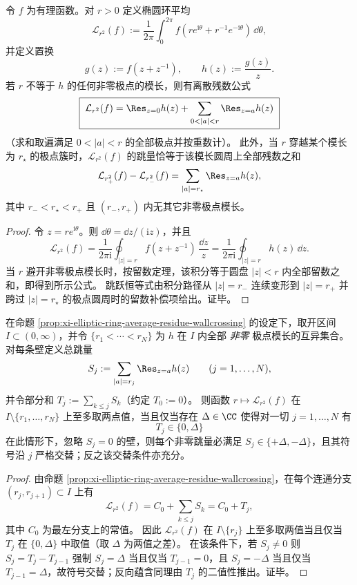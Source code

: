 \begin{proposition}[椭圆环平均的离散残数公式与壁穿越跳跃]\label{prop:xi-elliptic-ring-average-residue-wallcrossing}
令 \(f\) 为有理函数。对 \(r>0\) 定义椭圆环平均
\[
\mathcal L_{r^2}(f):=\frac{1}{2\pi}\int_{0}^{2\pi} f\!\left(re^{\mathrm{i}\theta}+r^{-1}e^{-\mathrm{i}\theta}\right)\,\dd\theta,
\]
并定义置换
\[
g(z):=f(z+z^{-1}),\qquad h(z):=\frac{g(z)}{z}.
\]
若 \(r\) 不等于 \(h\) 的任何非零极点的模长，则有离散残数公式
\[
\boxed{\;
\mathcal L_{r^2}(f)=\Res_{z=0}h(z)+\sum_{0<|a|<r}\Res_{z=a}h(z)\;}
\]
（求和取遍满足 \(0<|a|<r\) 的全部极点并按重数计）。
此外，当 \(r\) 穿越某个模长为 \(r_\star\) 的极点簇时，\(\mathcal L_{r^2}(f)\) 的跳量恰等于该模长圆周上全部残数之和
\[
\mathcal L_{r_+^2}(f)-\mathcal L_{r_-^2}(f)=\sum_{|a|=r_\star}\Res_{z=a}h(z),
\]
其中 \(r_-<r_\star<r_+\) 且 \((r_-,r_+)\) 内无其它非零极点模长。
\end{proposition}
\begin{proof}
令 \(z=re^{\mathrm{i}\theta}\)。则 \(\dd\theta=\dd z/(\mathrm{i}z)\)，并且
\[
\mathcal L_{r^2}(f)=\frac{1}{2\pi \mathrm{i}}\oint_{|z|=r} f(z+z^{-1})\,\frac{\dd z}{z}
=\frac{1}{2\pi\mathrm{i}}\oint_{|z|=r}h(z)\,\dd z.
\]
当 \(r\) 避开非零极点模长时，按留数定理，该积分等于圆盘 \(|z|<r\) 内全部留数之和，即得到所示公式。
跳跃恒等式由积分路径从 \(|z|=r_-\) 连续变形到 \(|z|=r_+\) 并跨过 \(|z|=r_\star\) 的极点圆周时的留数补偿项给出。证毕。
\end{proof}

\begin{theorem}[椭圆环平均的两值壁穿越判别]\label{thm:xi-elliptic-ring-average-two-valued-wallcrossing}
在命题 \ref{prop:xi-elliptic-ring-average-residue-wallcrossing} 的设定下，取开区间 \(I\subset(0,\infty)\)，并令
\(\{r_1<\cdots<r_N\}\) 为 \(h\) 在 \(I\) 内全部 \emph{非零} 极点模长的互异集合。
对每条壁定义总跳量
\[
S_j:=\sum_{|a|=r_j}\Res_{z=a}h(z)\qquad(j=1,\dots,N),
\]
并令部分和 \(T_j:=\sum_{k\le j}S_k\)（约定 \(T_0:=0\)）。
则函数 \(r\mapsto\mathcal L_{r^2}(f)\) 在 \(I\setminus\{r_1,\dots,r_N\}\) 上至多取两点值，当且仅当存在 \(\Delta\in\CC\) 使得对一切 \(j=1,\dots,N\) 有
\[
\boxed{\;T_j\in\{0,\Delta\}\;}
\]
在此情形下，忽略 \(S_j=0\) 的壁，则每个非零跳量必满足 \(S_j\in\{+\Delta,-\Delta\}\)，且其符号沿 \(j\) 严格交替；反之该交替条件亦充分。
\end{theorem}
\begin{proof}
由命题 \ref{prop:xi-elliptic-ring-average-residue-wallcrossing}，在每个连通分支 \((r_j,r_{j+1})\subset I\) 上有
\[
\mathcal L_{r^2}(f)=C_0+\sum_{k\le j}S_k=C_0+T_j,
\]
其中 \(C_0\) 为最左分支上的常值。
因此 \(\mathcal L_{r^2}(f)\) 在 \(I\setminus\{r_j\}\) 上至多取两值当且仅当 \(T_j\) 在 \(\{0,\Delta\}\) 中取值（取 \(\Delta\) 为两值之差）。
在该条件下，若 \(S_j\neq 0\) 则 \(S_j=T_j-T_{j-1}\) 强制 \(S_j=\Delta\) 当且仅当 \(T_{j-1}=0\)，且 \(S_j=-\Delta\) 当且仅当 \(T_{j-1}=\Delta\)，故符号交替；反向蕴含同理由 \(T_j\) 的二值性推出。证毕。
\end{proof}

